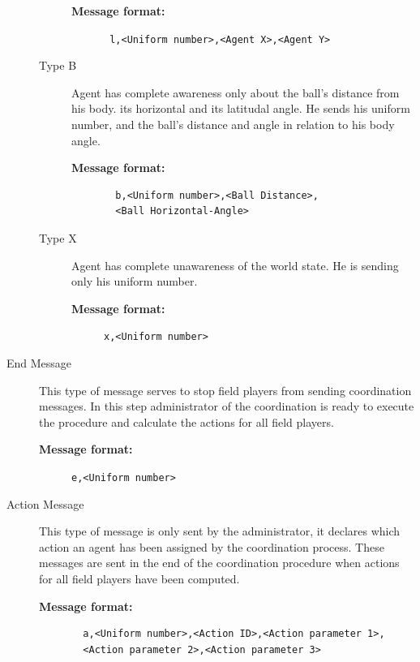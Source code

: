\begin{description}
\begin{description}
\begin{description}
  \item[{\bf Message format:}]
  \texttt{ l,<Uniform number>,<Agent X>,<Agent Y>}
\end{description}

\item[Type B] Agent has complete awareness only about the ball's distance from his body. its horizontal and its latitudal angle. He sends his uniform number,  and the ball's distance and angle in relation to his body angle.

\begin{description}
  \item[{\bf Message format:}]
  \begin{verbatim}  
  b,<Uniform number>,<Ball Distance>,
  <Ball Horizontal-Angle>\end{verbatim}
\end{description}

\item[Type X] Agent has complete unawareness of the world state. He is sending only his uniform number.

\begin{description}
 \item[{\bf Message format:}]
 \texttt{x,<Uniform number>}
\end{description}

\end{description}
\item[End Message]
This type of message serves to stop field players from sending coordination messages. In this step administrator of the coordination is ready to execute the procedure and calculate the actions for all field players.
\begin{description}
  \item[{\bf Message format:}] 
  \texttt{e,<Uniform number>}
\end{description}
\item[Action Message]
This type of message is only sent by the administrator, it declares which action an agent has been assigned by the coordination process. These messages are sent in the end of the coordination procedure when actions for all field players have been computed.
\begin{description}
  \item[{\bf Message format:}]
  \begin{verbatim}
  a,<Uniform number>,<Action ID>,<Action parameter 1>,
  <Action parameter 2>,<Action parameter 3>\end{verbatim}
\end{description}

\end{description}

